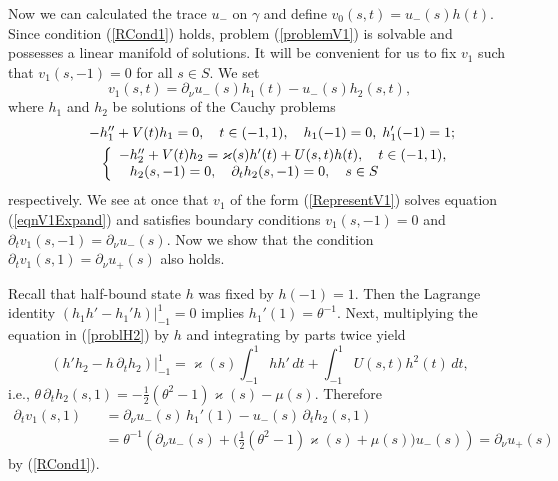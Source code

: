 \documentclass[graybox]{svmult}
\renewcommand{\kappa}{\varkappa}
\newcommand{\eqref}[1]{(\ref{#1})}
\begin{document}
Now we can calculated the trace $u_-$ on $\gamma$ and  define $v_0(s,t)=u_-(s)h(t)$. Since  condition \eqref{RCond1} holds,
problem \eqref{problemV1} is solvable and possesses a li\-near manifold of
solutions. It will be convenient for us to fix $v_1$ such that $v_1(s,-1)=0$ for all $s\in S$. We set
\begin{equation}\label{RepresentV1}
  v_1(s,t)=\partial_\nu u_-(s)h_1(t)-u_-(s)h_2(s,t),
\end{equation}
where $h_1$ and $h_2$ be solutions of the Cauchy problems
\begin{eqnarray}\nonumber
&&\kern8pt-h_1''+V(t)h_1=0,\quad t\in (-1,1),\quad  h_1(-1)=0, \; h_1'(-1)=1;\\
&&
\left\{
\begin{array}{ll}
-h_2''+V(t)h_2=\kappa(s)h'(t)+U(s,t)h(t),\quad t\in (-1,1),\\\label{problH2}
\phantom{-}h_2(s,-1)=0, \quad \partial_th_2(s,-1)=0,\quad s\in S
\end{array}
\right.
\end{eqnarray}
respectively.
We see at once that  $v_1$ of the form \eqref{RepresentV1} solves equation \eqref{eqnV1Expand} and satisfies boundary conditions $v_1(s,-1)=0$ and $\partial_t v_1(s, -1)=\partial_\nu u_-(s)$. Now we show that the condition $\partial_t v_1(s, 1)=\partial_\nu u_+(s)$ also holds.

Recall that half-bound state $h$ was fixed by  $h(-1)=1$. Then
the Lagrange identity $(h_1h'-h_1'h)|_{-1}^1=0$ implies  $h_1'(1)=\theta^{-1}$.
Next, multiplying the equation in \eqref{problH2} by $h$ and  integrating by parts twice yield
$$
 (h'h_2-h\,\partial_th_2)\big|_{-1}^1=\kappa(s)\int_{-1}^1hh'\,dt
  +\int_{-1}^1U(s,t)h^2(t)\, dt,
$$
i.e., $\theta \,\partial_th_2(s,1)=-\frac{1}{2 }(\theta^2-1)\kappa(s)-\mu(s)$.
Therefore
\begin{eqnarray}\nonumber
\partial_t v_1(s,1)&&=\partial_\nu u_-(s)\,h_1'(1)- u_-(s)\,\partial_th_2(s,1)\\\nonumber
&&=\theta^{-1} \left(\partial_\nu u_-(s)+\big(\textstyle\frac{1}{2 }(\theta^2-1)\kappa(s)+\mu(s)\big)u_-(s)\right)=\partial_\nu u_+(s)
\end{eqnarray}
by \eqref{RCond1}.
\end{document}
